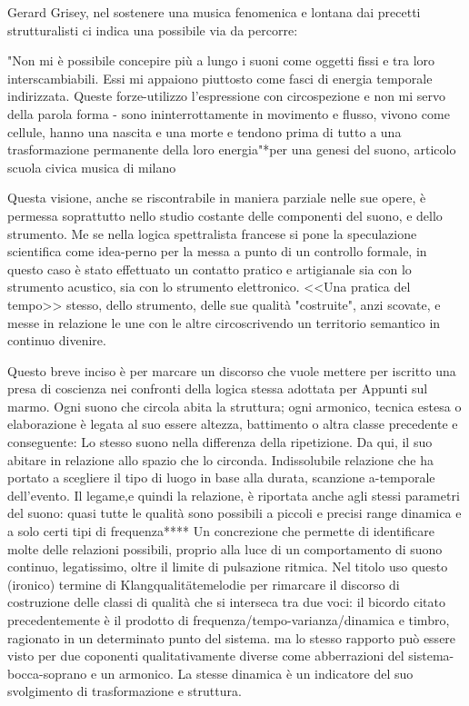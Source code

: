 Gerard Grisey, nel sostenere una musica fenomenica e lontana dai precetti strutturalisti ci indica una possibile via da percorre:

 "Non mi è possibile concepire più a lungo i suoni come oggetti fissi e tra loro interscambiabili. Essi mi appaiono piuttosto come fasci di energia temporale indirizzata. Queste forze-utilizzo l'espressione con circospezione e non mi servo della parola forma - sono ininterrottamente in movimento e flusso, vivono come cellule, hanno una nascita e una morte e tendono prima di tutto a una trasformazione permanente della loro energia"*per una genesi del suono, articolo scuola civica musica di milano

Questa visione, anche se riscontrabile in maniera parziale nelle sue opere, è permessa soprattutto nello studio costante delle componenti del suono, e dello strumento.
Me se nella logica spettralista francese si pone la speculazione scientifica come idea-perno per la messa a punto di un controllo formale, in questo caso è stato effettuato un contatto pratico e artigianale sia con lo strumento acustico, sia con lo strumento elettronico.
<<Una pratica del tempo>> stesso, dello strumento, delle sue qualità "costruite", anzi scovate, e messe in relazione le une con le altre circoscrivendo un territorio semantico in continuo divenire.

Questo breve inciso è per marcare un discorso che vuole mettere per iscritto una presa di coscienza nei confronti della logica stessa adottata per Appunti sul marmo.
Ogni suono che circola abita la struttura; ogni armonico, tecnica estesa o elaborazione è legata al suo essere altezza, battimento o altra classe precedente e conseguente: Lo stesso suono nella differenza della ripetizione.
Da qui, il suo abitare in relazione allo spazio che lo circonda. Indissolubile relazione che ha portato a scegliere il tipo di luogo in base alla durata, scanzione a-temporale dell'evento.
Il legame,e quindi la relazione, è riportata anche agli stessi parametri del suono: quasi tutte le qualità sono possibili a piccoli e precisi range  dinamica e a solo certi tipi di frequenza****
Un concrezione che permette di identificare molte delle relazioni possibili, proprio alla luce di un comportamento di suono continuo, legatissimo, oltre il limite di pulsazione ritmica.
Nel titolo uso questo (ironico) termine di Klangqualitätemelodie  per rimarcare il discorso di costruzione delle classi di qualità che si interseca tra due voci:
il bicordo citato precedentemente è il prodotto di frequenza/tempo-varianza/dinamica e timbro, ragionato in un determinato punto del sistema.
ma lo stesso rapporto può essere visto per due coponenti qualitativamente diverse come abberrazioni del sistema-bocca-soprano e un armonico.
La stesse dinamica è un indicatore del suo svolgimento di trasformazione e struttura.


